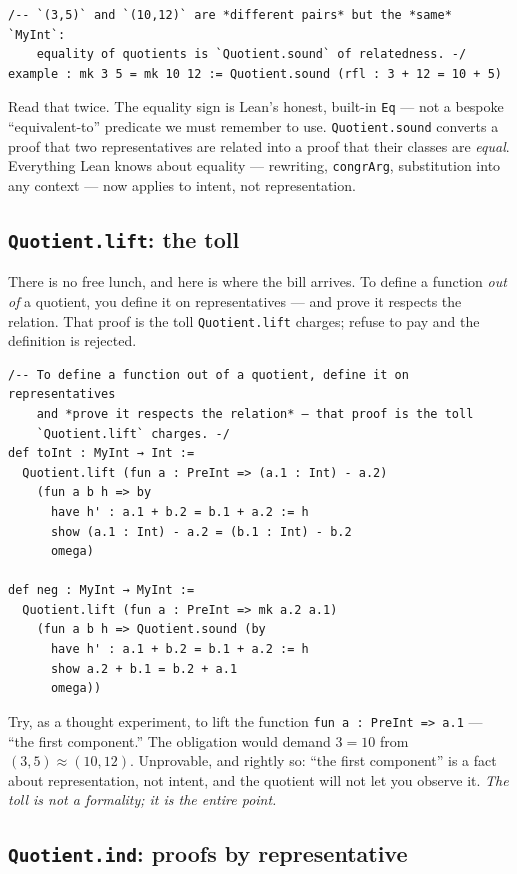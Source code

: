 \documentclass[12pt, a4paper, openright]{book}
\theoremstyle{thmstyle}
\theoremstyle{defstyle}
\newcommand{\lc}[1]{\texttt{#1}}
\begin{document}
\begin{verbatim}
/-- `(3,5)` and `(10,12)` are *different pairs* but the *same* `MyInt`:
    equality of quotients is `Quotient.sound` of relatedness. -/
example : mk 3 5 = mk 10 12 := Quotient.sound (rfl : 3 + 12 = 10 + 5)
\end{verbatim}

Read that twice. The equality sign is Lean's honest, built-in
\lc{Eq} --- not a bespoke ``equivalent-to'' predicate we must remember to
use. \lc{Quotient.sound} converts a proof that two representatives are
related into a proof that their classes are \emph{equal}. Everything Lean
knows about equality --- rewriting, \lc{congrArg}, substitution into any
context --- now applies to intent, not representation.

\subsection{\texttt{Quotient.lift}: the toll}

There is no free lunch, and here is where the bill arrives. To define a
function \emph{out of} a quotient, you define it on representatives ---
and prove it respects the relation. That proof is the toll
\lc{Quotient.lift} charges; refuse to pay and the definition is rejected.

\begin{verbatim}
/-- To define a function out of a quotient, define it on representatives
    and *prove it respects the relation* — that proof is the toll
    `Quotient.lift` charges. -/
def toInt : MyInt → Int :=
  Quotient.lift (fun a : PreInt => (a.1 : Int) - a.2)
    (fun a b h => by
      have h' : a.1 + b.2 = b.1 + a.2 := h
      show (a.1 : Int) - a.2 = (b.1 : Int) - b.2
      omega)

def neg : MyInt → MyInt :=
  Quotient.lift (fun a : PreInt => mk a.2 a.1)
    (fun a b h => Quotient.sound (by
      have h' : a.1 + b.2 = b.1 + a.2 := h
      show a.2 + b.1 = b.2 + a.1
      omega))
\end{verbatim}

Try, as a thought experiment, to lift the function
\lc{fun a : PreInt => a.1} --- ``the first component.'' The obligation
would demand $3 = 10$ from $(3,5) \approx (10,12)$. Unprovable, and
rightly so: ``the first component'' is a fact about representation, not
intent, and the quotient will not let you observe it. \emph{The toll is
not a formality; it is the entire point.}

\subsection{\texttt{Quotient.ind}: proofs by representative}
\end{document}
